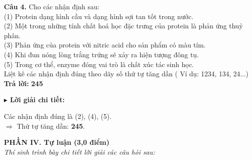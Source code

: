 \documentclass[11pt,a4paper]{article}
\newcommand{\loigiai}[1]{
    \par\vspace{2pt}
    \begingroup\leftskip=12pt
    \textcolor{solBlue}{\textbf{$\blacktriangleright$ Lời giải chi tiết:}}\par
    \small #1
    \par\endgroup\vspace{3pt}
}
\begin{document}
\vspace{2pt}
\textbf{Câu 4.} Cho các nhận định sau:\\
(1) Protein dạng hình cầu và dạng hình sợi tan tốt trong nước.\\
(2) Một trong những tính chất hoá học đặc trưng của protein là phản ứng thuỷ phân.\\
(3) Phản ứng của protein với nitric acid cho sản phẩm có màu tím.\\
(4) Khi đun nóng lòng trắng trứng sẽ xảy ra hiện tượng đông tụ.\\
(5) Trong cơ thể, enzyme đóng vai trò là chất xúc tác sinh học.\\
Liệt kê các nhận định đúng theo dãy số thứ tự tăng dần ( Ví dụ: 1234, 134, 24...)\\[2pt]
\textbf{Trả lời:} \textbf{\color{ansRed}245}\\[2pt]
\loigiai{Các nhận định đúng là (2), (4), (5).\\
$\Rightarrow$ Thứ tự tăng dần: \textbf{245}.}
\vspace{2pt}

\vspace{4pt}
\noindent\textbf{\large\color{mainGreen}PHẦN IV. Tự luận (3,0 điểm)}\\
\textit{Thí sinh trình bày chi tiết lời giải các câu hỏi sau:}
\vspace{4pt}
\end{document}

